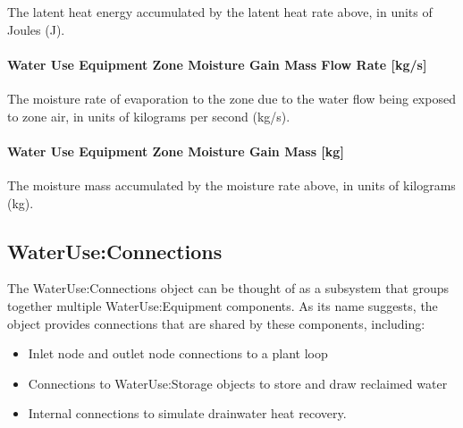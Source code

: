 The latent heat energy accumulated by the latent heat rate above, in units of Joules (J).

\paragraph{Water Use Equipment Zone Moisture Gain Mass Flow Rate {[}kg/s{]}}\label{water-use-equipment-zone-moisture-gain-mass-flow-rate-kgs}

The moisture rate of evaporation to the zone due to the water flow being exposed to zone air, in units of kilograms per second (kg/s).

\paragraph{Water Use Equipment Zone Moisture Gain Mass {[}kg{]}}\label{water-use-equipment-zone-moisture-gain-mass-kg}

The moisture mass accumulated by the moisture rate above, in units of kilograms (kg).

\subsection{WaterUse:Connections}\label{wateruseconnections}

The WaterUse:Connections object can be thought of as a subsystem that groups together multiple WaterUse:Equipment components. As its name suggests, the object provides connections that are shared by these components, including:

\begin{itemize}
\item
  Inlet node and outlet node connections to a plant loop
\item
  Connections to WaterUse:Storage objects to store and draw reclaimed water
\item
  Internal connections to simulate drainwater heat recovery.
\end{itemize}

